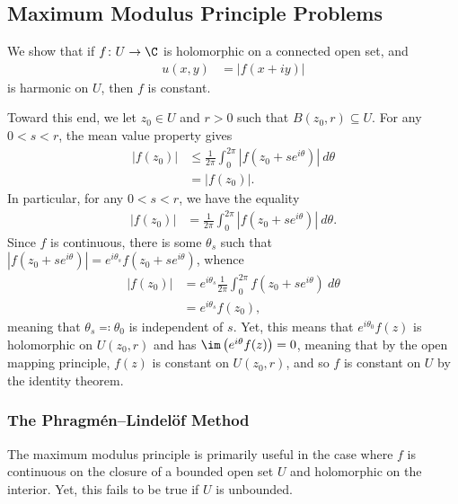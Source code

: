 \documentclass[10pt]{mypackage}
\begin{document}
\subsection{Maximum Modulus Principle Problems}%
\begin{example}
  We show that if $f\colon U\rightarrow \C$ is holomorphic on a connected open set, and
  \begin{align*}
    u\left( x,y \right) &= \left\vert f\left( x + iy \right) \right\vert
  \end{align*}
  is harmonic on $U$, then $f$ is constant.%

  Toward this end, we let $z_0\in U$ and $r > 0$ such that $B\left( z_0,r \right)\subseteq U$. For any $0 < s < r$, the mean value property gives
  \begin{align*}
    \left\vert f\left( z_0 \right) \right\vert &\leq \frac{1}{2\pi} \int_{0}^{2\pi} \left\vert f\left( z_0 + se^{i\theta} \right) \right\vert\:d\theta\\
                                               &= \left\vert f\left( z_0 \right) \right\vert.
  \end{align*}
  In particular, for any $0 < s < r$, we have the equality
  \begin{align*}
    \left\vert f\left( z_0 \right) \right\vert &= \frac{1}{2\pi} \int_{0}^{2\pi} \left\vert f\left( z_0 + se^{i\theta} \right) \right\vert\:d\theta.
  \end{align*}
  Since $f$ is continuous, there is some $\theta_s$ such that $\left\vert f\left( z_0 + se^{i\theta} \right) \right\vert = e^{i\theta_s}f\left( z_0 + se^{i\theta} \right)$, whence
  \begin{align*}
    \left\vert f\left( z_0 \right) \right\vert &= e^{i\theta_s} \frac{1}{2\pi} \int_{0}^{2\pi} f\left( z_0 + se^{i\theta} \right)\:d\theta\\
                                               &= e^{i\theta_s} f\left( z_0 \right),
  \end{align*}
  meaning that $\theta_s \eqcolon \theta_0$ is independent of $s$. Yet, this means that $e^{i\theta_0}f\left( z \right)$ is holomorphic on $U\left( z_0,r \right)$ and has $\im\left( e^{i\theta}f(z) \right) = 0$, meaning that by the open mapping principle, $f(z)$ is constant on $U\left( z_0,r \right)$, and so $f$ is constant on $U$ by the identity theorem.
\end{example}
\subsubsection{The Phragmén--Lindelöf Method}%
The maximum modulus principle is primarily useful in the case where $f$ is continuous on the closure of a bounded open set $U$ and holomorphic on the interior. Yet, this fails to be true if $U$ is unbounded.%
\end{document}

